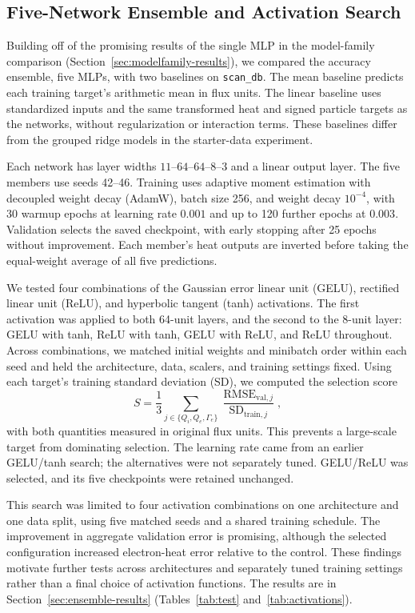 \documentclass[12pt,letterpaper]{article}
\begin{document}
\subsection{Five-Network Ensemble and Activation Search}
\label{sec:ensemble-methods}

Building off of the promising results of the single MLP in the model-family
comparison (Section~\ref{sec:modelfamily-results}), we compared the accuracy ensemble, five MLPs, with two baselines on \texttt{scan\_db}.
The mean baseline predicts each training target's arithmetic mean in flux
units. The linear baseline uses standardized inputs and the same transformed
heat and signed particle targets as the networks, without regularization or
interaction terms. These baselines differ from the grouped ridge models in
the starter-data experiment.

Each network has layer widths $11$--$64$--$64$--$8$--$3$ and a linear output
layer. The five members use seeds 42--46. Training uses adaptive moment estimation with decoupled weight decay
(AdamW), batch size 256,
and weight decay $10^{-4}$, with 30 warmup epochs at learning rate $0.001$
and up to 120 further epochs at $0.003$. Validation selects the saved checkpoint,
with early stopping after 25 epochs without improvement. Each member's heat
outputs are inverted before taking the equal-weight average of all five
predictions.

We tested four combinations of the Gaussian error linear unit (GELU),
rectified linear unit (ReLU), and hyperbolic tangent (tanh) activations. The first activation was applied to
both 64-unit layers, and the second to the 8-unit layer: GELU with tanh,
ReLU with tanh, GELU with ReLU, and ReLU throughout. Across combinations, we matched initial
weights and minibatch order within each seed and held the architecture, data,
scalers, and training settings fixed. Using each target's training standard
deviation (SD), we computed the selection score
\begin{equation}
  S = \frac{1}{3}\sum_{j\in\{Q_i,Q_e,\Gamma_e\}}
  \frac{\operatorname{RMSE}_{\mathrm{val},j}}
  {\operatorname{SD}_{\mathrm{train},j}},
  \label{eq:selection}
\end{equation}
with both quantities measured in original flux units. This prevents a
large-scale target from dominating selection. The learning rate came from
an earlier GELU/tanh search; the alternatives were not separately tuned.
GELU/ReLU was selected, and its five checkpoints were retained unchanged.

This search was limited to four activation combinations on one architecture
and one data split, using five matched seeds and a shared training schedule.
The improvement in aggregate validation error is promising, although the
selected configuration increased electron-heat error relative to the control.
These findings motivate further tests across architectures and separately
tuned training settings rather than a final choice of activation functions.
The results are in Section~\ref{sec:ensemble-results} (Tables~\ref{tab:test}
and~\ref{tab:activations}).
\end{document}
